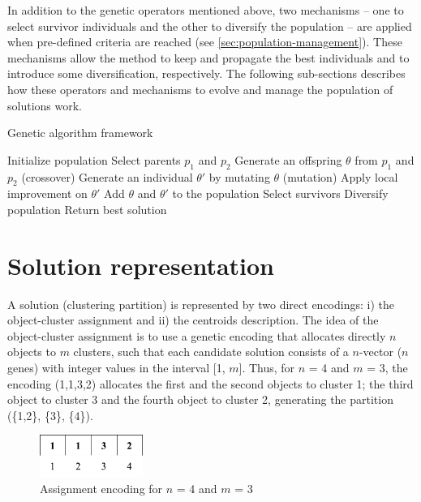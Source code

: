 In addition to the genetic operators mentioned above, two mechanisms -- one to select survivor individuals and the other to diversify the population -- are applied when pre-defined criteria are reached (see \ref{sec:population-management}). These mechanisms allow the method to keep and propagate the best individuals and to introduce some diversification, respectively. The following sub-sections describes how these operators and mechanisms to evolve and manage the population of solutions work.

\begin{algorithm}[!h]
\caption{Genetic algorithm framework}
\label{genetic-algo}
\begin{algorithmic}[1]
\STATE Initialize population
\STATE Select parents $p_1$ and $p_2$
\STATE Generate an offspring $\theta$ from $p_1$ and $p_2$ (crossover)
\STATE Generate an individual $\theta'$ by mutating $\theta$ (mutation)
\STATE Apply local improvement on $\theta'$
\STATE Add $\theta$ and $\theta'$ to the population
\STATE Select survivors
\STATE Diversify population
\ENDIF
\ENDIF
\ENDWHILE
\STATE Return best solution
\end{algorithmic}
\end{algorithm}

\section{Solution representation}
\label{sec:solution-representation}
A solution (clustering partition) is represented by two direct encodings: i) the object-cluster assignment and ii) the centroids description. The idea of the object-cluster assignment is to use a genetic encoding that allocates directly $n$ objects to $m$ clusters, such that each candidate solution consists of a $n$-vector ($n$ genes) with integer values in the interval [1, $m$]. Thus, for $n$ = 4 and $m$ = 3, the encoding (1,1,3,2) allocates the first and the second objects to cluster 1; the third object to cluster 3 and the fourth object to cluster 2, generating the partition (\{1,2\}, \{3\}, \{4\}).

\begin{figure}[h]
  \begin{center}
    \includegraphics[width=0.3\textwidth]{img/assignment-encoding}
    \caption{Assignment encoding for $n$ = 4 and $m$ = 3}\label{fig:assignment-encoding}
  \end{center}
\end{figure}

